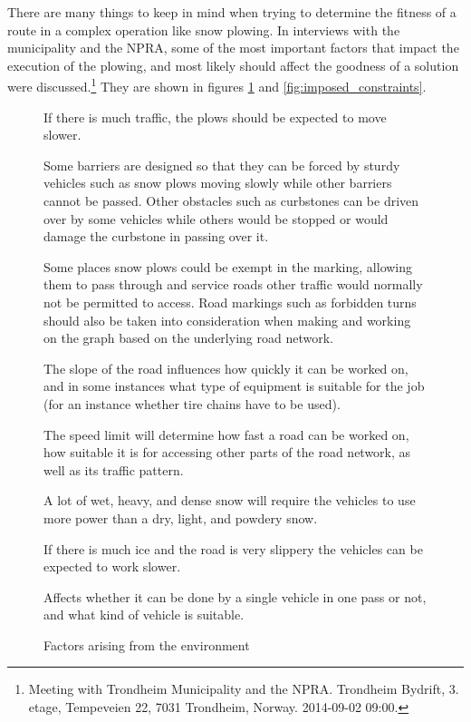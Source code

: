 There are many things to keep in mind when trying to determine the fitness of a route in a complex operation like snow plowing. In interviews with the municipality and the NPRA, some of the most important factors that impact the execution of the plowing, and most likely should affect the goodness of a solution were discussed.\footnote{Meeting with Trondheim Municipality and the NPRA. Trondheim Bydrift, 3. etage, Tempeveien 22, 7031 Trondheim, Norway. 2014-09-02 09:00.} They are shown in figures \ref{fig:environmental_factors} and \ref{fig:imposed_constraints}.


\begin{figure}[thbp]
\caption{Factors arising from the environment}
\label{fig:environmental_factors}
\begin{description}
    \item [Amount of traffic.] If there is much traffic, the plows should be expected to move slower.
    \item [Obstacles such as barriers and curbstones.] Some barriers are designed so that they can be forced by sturdy vehicles such as snow plows moving slowly while other barriers cannot be passed. Other obstacles such as curbstones can be driven over by some vehicles while others would be stopped or would damage the curbstone in passing over it.
    \item [Road marking and regulation.] Some places snow plows could be exempt in the marking, allowing them to pass through and service roads other traffic would normally not be permitted to access. Road markings such as forbidden turns should also be taken into consideration when making and working on the graph based on the underlying road network.
    \item [Slope of the road.] The slope of the road influences how quickly it can be worked on, and in some instances what type of equipment is suitable for the job (for an instance whether tire chains have to be used).
    \item [Speed limit.] The speed limit will determine how fast a road can be worked on, how suitable it is for accessing other parts of the road network, as well as its traffic pattern.
    \item [Weather -- Quality of the snow.] A lot of wet, heavy, and dense snow will require the vehicles to use more power than a dry, light, and powdery snow.
    \item [Weather -- Slipperiness of the road.] If there is much ice and the road is very slippery the vehicles can be expected to work slower.
    \item [Width of the road.] Affects whether it can be done by a single vehicle in one pass or not, and what kind of vehicle is suitable.
\end{description}
\end{figure}

